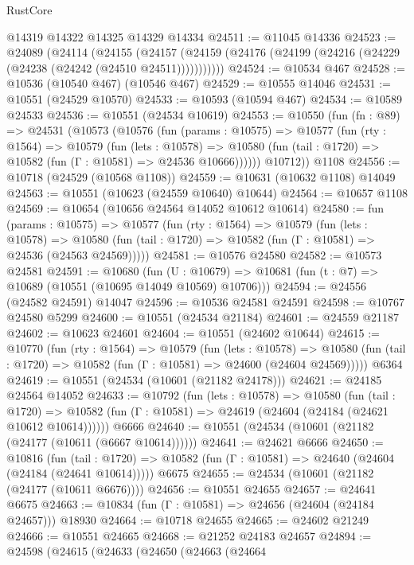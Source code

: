 \begin{lexlean}{RustCore}
\begin{coremodule}
    @14319
    @14322
    @14325
    @14329
    @14334
@24511 := @11045 @14336
@24523 := @24089
    (@24114
      (@24155
        (@24157 (@24159 (@24176 (@24199 (@24216 (@24229 (@24238 (@24242 (@24510 @24511)))))))))))
@24524 := @10534 @467
@24528 := @10536 (@10540 @467) (@10546 @467)
@24529 := @10555 @14046
@24531 := @10551 (@24529 @10570)
@24533 := @10593 (@10594 @467)
@24534 := @10589 @24533
@24536 := @10551 (@24534 @10619)
@24553 := @10550
    (fun (fn : @89) =>
    @24531
      (@10573
        (@10576
          (fun (params : @10575) =>
          @10577
            (fun (rty : @1564) =>
            @10579
              (fun (lets : @10578) =>
              @10580 (fun (tail : @1720) => @10582 (fun (Γ : @10581) => @24536 @10666))))))
        @10712))
    @1108
@24556 := @10718 (@24529 (@10568 @1108))
@24559 := @10631 (@10632 @1108) @14049
@24563 := @10551 (@10623 (@24559 @10640) @10644)
@24564 := @10657 @1108
@24569 := @10654 (@10656 @24564 @14052 @10612 @10614)
@24580 := fun (params : @10575) =>
  @10577
    (fun (rty : @1564) =>
    @10579
      (fun (lets : @10578) =>
      @10580 (fun (tail : @1720) => @10582 (fun (Γ : @10581) => @24536 (@24563 @24569)))))
@24581 := @10576 @24580
@24582 := @10573 @24581
@24591 := @10680
    (fun (U : @10679) => @10681 (fun (t : @7) => @10689 (@10551 (@10695 @14049 @10569) @10706)))
@24594 := @24556 (@24582 @24591) @14047
@24596 := @10536 @24581 @24591
@24598 := @10767 @24580 @5299
@24600 := @10551 (@24534 @21184)
@24601 := @24559 @21187
@24602 := @10623 @24601
@24604 := @10551 (@24602 @10644)
@24615 := @10770
    (fun (rty : @1564) =>
    @10579
      (fun (lets : @10578) =>
      @10580 (fun (tail : @1720) => @10582 (fun (Γ : @10581) => @24600 (@24604 @24569)))))
    @6364
@24619 := @10551 (@24534 (@10601 (@21182 @24178)))
@24621 := @24185 @24564 @14052
@24633 := @10792
    (fun (lets : @10578) =>
    @10580
      (fun (tail : @1720) =>
      @10582 (fun (Γ : @10581) => @24619 (@24604 (@24184 (@24621 @10612 @10614))))))
    @6666
@24640 := @10551 (@24534 (@10601 (@21182 (@24177 (@10611 (@6667 @10614))))))
@24641 := @24621 @6666
@24650 := @10816
    (fun (tail : @1720) => @10582 (fun (Γ : @10581) => @24640 (@24604 (@24184 (@24641 @10614)))))
    @6675
@24655 := @24534 (@10601 (@21182 (@24177 (@10611 @6676))))
@24656 := @10551 @24655
@24657 := @24641 @6675
@24663 := @10834 (fun (Γ : @10581) => @24656 (@24604 (@24184 @24657))) @18930
@24664 := @10718 @24655
@24665 := @24602 @21249
@24666 := @10551 @24665
@24668 := @21252 @24183 @24657
@24894 := @24598
    (@24615
      (@24633
        (@24650
          (@24663
            (@24664

\end{coremodule}
\end{lexlean}

